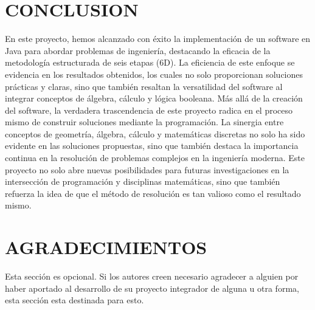 \documentclass{IEEEcsmag}
\begin{document}
\section{CONCLUSION}
En este proyecto, hemos alcanzado con éxito la implementación de un software en Java para abordar problemas de ingeniería, destacando la eficacia de la metodología estructurada de seis etapas (6D). La eficiencia de este enfoque se evidencia en los resultados obtenidos, los cuales no solo proporcionan soluciones prácticas y claras, sino que también resaltan la versatilidad del software al integrar conceptos de álgebra, cálculo y lógica booleana. 
Más allá de la creación del software, la verdadera trascendencia de este proyecto radica en el proceso mismo de construir soluciones mediante la programación. La sinergia entre conceptos de geometría, álgebra, cálculo y matemáticas discretas no solo ha sido evidente en las soluciones propuestas, sino que también destaca la importancia continua en la resolución de problemas complejos en la ingeniería moderna. Este proyecto no solo abre nuevas posibilidades para futuras investigaciones en la intersección de programación y disciplinas matemáticas, sino que también refuerza la idea de que el método de resolución es tan valioso como el resultado mismo.
\vspace*{-8pt}


\section{AGRADECIMIENTOS}
Esta sección es opcional. Si los autores creen necesario agradecer a alguien por haber aportado al desarrollo de su proyecto integrador de alguna u otra forma, esta sección esta destinada para esto.


\def\refname{REFERENCES}
\end{document}

